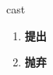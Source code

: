 
\begin{frame}
{\huge cast}
\begin{center}
\begin{enumerate}\Large
  \item \textbf{提出}
  \item \textbf{抛弃}
\end{enumerate}
\end{center}
\end{frame}
